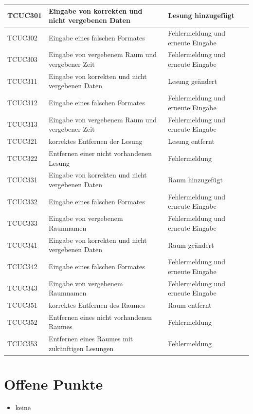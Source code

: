 \documentclass[a4paper]{article}
\begin{document}
\begin{longtable}{|p{50px}|p{200px}|p{100px}|}
	TCUC301 & Eingabe von korrekten und nicht vergebenen Daten & Lesung hinzugefügt \\ \hline
	TCUC302 & Eingabe eines falschen Formates & Fehlermeldung und erneute Eingabe \\ \hline
	TCUC303 & Eingabe von vergebenem Raum und vergebener Zeit & Fehlermeldung und erneute Eingabe \\ \hline
	TCUC311 & Eingabe von korrekten und nicht vergebenen Daten & Lesung geändert \\ \hline
	TCUC312 & Eingabe eines falschen Formates & Fehlermeldung und erneute Eingabe \\ \hline
	TCUC313 & Eingabe von vergebenem Raum und vergebener Zeit & Fehlermeldung und erneute Eingabe \\ \hline
	TCUC321 & korrektes Entfernen der Lesung & Lesung entfernt \\ \hline
	TCUC322 & Entfernen einer nicht vorhandenen Lesung & Fehlermeldung \\ \hline	
	TCUC331 & Eingabe von korrekten und nicht vergebenen Daten & Raum hinzugefügt \\ \hline
	TCUC332 & Eingabe eines falschen Formates & Fehlermeldung und erneute Eingabe \\ \hline
	TCUC333 & Eingabe von vergebenem Raumnamen & Fehlermeldung und erneute Eingabe \\ \hline
	TCUC341 & Eingabe von korrekten und nicht vergebenen Daten & Raum geändert \\ \hline
	TCUC342 & Eingabe eines falschen Formates & Fehlermeldung und erneute Eingabe \\ \hline
	TCUC343 & Eingabe von vergebenem Raumnamen & Fehlermeldung und erneute Eingabe \\ \hline
	TCUC351 & korrektes Entfernen des Raumes & Raum entfernt \\ \hline
	TCUC352 & Entfernen eines nicht vorhandenen Raumes & Fehlermeldung \\ \hline
	TCUC353 & Entfernen eines Raumes mit zukünftigen Lesungen & Fehlermeldung \\ \hline
\end{longtable}

\section{Offene Punkte}

\begin{itemize}
	\item keine
\end{itemize}
\end{document}
